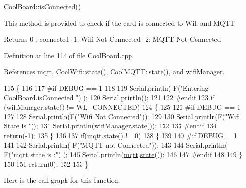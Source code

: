 \hyperlink{classCoolBoard_ad7442cf4b62c7b0d5bd62a0f75ffc065}{Cool\+Board\+::is\+Connected()}

This method is provided to check if the card is connected to Wifi and M\+Q\+TT

\begin{DoxyReturn}{Returns}
0 \+: connected -\/1\+: Wifi Not Connected -\/2\+: M\+Q\+TT Not Connected 
\end{DoxyReturn}


Definition at line 114 of file Cool\+Board.\+cpp.



References mqtt, Cool\+Wifi\+::state(), Cool\+M\+Q\+T\+T\+::state(), and wifi\+Manager.


\begin{DoxyCode}
115 \{
116 
117 \textcolor{preprocessor}{#if DEBUG == 1  }
118 
119     Serial.println( F(\textcolor{stringliteral}{"Entering CoolBoard.isConnected "}) );
120     Serial.println();
121 
122 \textcolor{preprocessor}{#endif}
123     \textcolor{keywordflow}{if} (\hyperlink{classCoolBoard_acd88e6003606b47479ebba81e4aceeca}{wifiManager}.\hyperlink{classCoolWifi_a1c7b4d82a4098d346e7593dce92039fa}{state}() != WL\_CONNECTED)
124     \{
125 
126 \textcolor{preprocessor}{    #if DEBUG == 1}
127     
128         Serial.println(F(\textcolor{stringliteral}{"Wifi Not Connected"}));
129 
130         Serial.println(F(\textcolor{stringliteral}{"Wifi State is "}));
131         Serial.println(\hyperlink{classCoolBoard_acd88e6003606b47479ebba81e4aceeca}{wifiManager}.\hyperlink{classCoolWifi_a1c7b4d82a4098d346e7593dce92039fa}{state}());
132         
133 \textcolor{preprocessor}{    #endif}
134         \textcolor{keywordflow}{return}(-1);
135     \}
136     
137     \textcolor{keywordflow}{if}(\hyperlink{classCoolBoard_a2399f44d7c23c1149a335cb3b46d90f1}{mqtt}.\hyperlink{classCoolMQTT_a5d003307eff78efbd585e42b43b72b6d}{state}() != 0)
138     \{
139     
140 \textcolor{preprocessor}{    #if DEBUG==1}
141         
142         Serial.println( F(\textcolor{stringliteral}{"MQTT not Connected"}));
143 
144         Serial.println( F(\textcolor{stringliteral}{"mqtt state is :"}) );
145         Serial.println(\hyperlink{classCoolBoard_a2399f44d7c23c1149a335cb3b46d90f1}{mqtt}.\hyperlink{classCoolMQTT_a5d003307eff78efbd585e42b43b72b6d}{state}());  
146     
147 \textcolor{preprocessor}{    #endif}
148 
149     \}
150     
151     \textcolor{keywordflow}{return}(0);
152 
153 \}
\end{DoxyCode}
Here is the call graph for this function\+:
\nopagebreak
